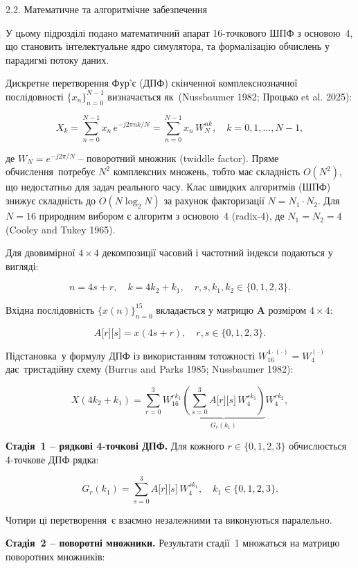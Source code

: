 \documentclass[
]{article}
\begin{document}
\protect{}\label{_Toc228121450}{}2.2. Математичне та
алгоритмічне забезпечення

У цьому підрозділі подано математичний апарат 16-точкового ШПФ з
основою~4, що становить інтелектуальне ядро симулятора, та формалізацію
обчислень у парадигмі потоку даних.

Дискретне перетворення Фур'є (ДПФ) скінченної комплекснозначної
послідовності \(\{ x_{n}\}_{n = 0}^{N - 1}\) визначається як~(Nussbaumer
1982; Процько et al. 2025):

\[X_{k} = \sum_{n = 0}^{N - 1}x_{n}\, e^{- j2\pi nk/N} = \sum_{n = 0}^{N - 1}x_{n}\, W_{N}^{nk},\quad k = 0,1,\ldots,N - 1,\]

де \(W_{N} = e^{- j2\pi/N}\) -- поворотний множник (twiddle factor).
Пряме обчислення~потребує \(N^{2}\) комплексних множень, тобто має
складність \(O(N^{2})\), що недостатньо для задач реального часу. Клас
швидких алгоритмів (ШПФ) знижує складність до \(O(N\log_{2}N)\) за
рахунок факторизації \(N = N_{1} \cdot N_{2}\). Для \(N = 16\) природним
вибором є алгоритм з основою~4 (radix-4), де \(N_{1} = N_{2} = 4\)
(Cooley and Tukey 1965).

Для двовимірної \(4 \times 4\) декомпозиції часовий і частотний індекси
подаються у вигляді:

\[n = 4s + r,\quad k = 4k_{2} + k_{1},\quad r,s,k_{1},k_{2} \in \{ 0,1,2,3\}.\]

Вхідна послідовність \(\{ x(n)\}_{n = 0}^{15}\) вкладається у матрицю
\(\mathbf{A}\) розміром \(4 \times 4\):

\[A\lbrack r\rbrack\lbrack s\rbrack = x(4s + r),\quad r,s \in \{ 0,1,2,3\}.\]

Підстановка~у формулу ДПФ із використанням тотожності
\(W_{16}^{4 \cdot ( \cdot )} = W_{4}^{( \cdot )}\) дає~тристадійну схему
(Burrus and Parks 1985; Nussbaumer 1982):

\[X(4k_{2} + k_{1}) = \sum_{r = 0}^{3}W_{16}^{rk_{1}}\underset{G_{r}(k_{1})}{\underbrace{\left( \sum_{s = 0}^{3}A\lbrack r\rbrack\lbrack s\rbrack\, W_{4}^{sk_{1}} \right)}}W_{4}^{rk_{2}},\]

\textbf{Стадія~1 -- рядкові 4-точкові ДПФ.} Для кожного
\(r \in \{ 0,1,2,3\}\) обчислюється 4-точкове ДПФ рядка:

\[G_{r}(k_{1}) = \sum_{s = 0}^{3}A\lbrack r\rbrack\lbrack s\rbrack\, W_{4}^{sk_{1}},\quad k_{1} \in \{ 0,1,2,3\}.\]

Чотири ці перетворення~є взаємно незалежними та виконуються паралельно.

\textbf{Стадія~2 -- поворотні множники.} Результати стадії~1 множаться
на матрицю поворотних множників:
\end{document}
